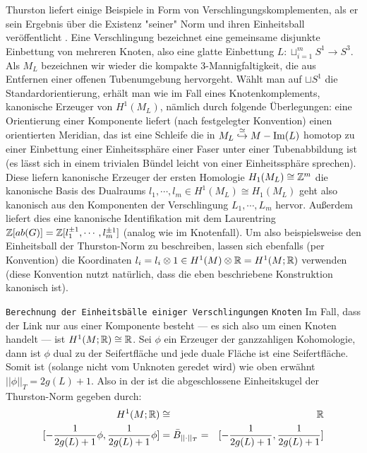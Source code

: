    \begin{bsp}[Verschlingungen]
    \label{ex:links}
        Thurston liefert einige Beispiele in Form von Verschlingungskomplementen, als er sein Ergebnis über die Existenz "seiner" Norm und ihren Einheitsball veröffentlicht \cite{Thurston1986}. Eine Verschlingung bezeichnet eine gemeinsame disjunkte Einbettung von mehreren Knoten, also eine glatte Einbettung $L: \sqcup_{i=1}^m S^1 \to S^3$. Als $M_L$ bezeichnen wir wieder die kompakte 3-Mannigfaltigkeit, die aus Entfernen einer offenen Tubenumgebung hervorgeht. Wählt man auf $\sqcup S^1$ die Standardorientierung, erhält man wie im Fall eines Knotenkomplements, kanonische Erzeuger von $H^1(M_L)$, nämlich durch folgende Überlegungen: eine Orientierung einer Komponente liefert (nach festgelegter Konvention) einen orientierten Meridian, das ist eine Schleife die in $M_L\stackrel \simeq {\hookrightarrow} M - \operatorname{Im}(L)$ homotop zu einer Einbettung einer Einheitssphäre einer Faser unter einer Tubenabbildung ist (es lässt sich in einem trivialen Bündel leicht von einer Einheitssphäre sprechen). Diese liefern kanonische Erzeuger der ersten Homologie $H_1(M_L) \cong \mathbb{Z}^m$ die kanonische Basis des Dualraums $l_1,\cdots,l_m \in H^1(M_L)\cong H_1(M_L)$ geht also kanonisch aus den Komponenten der Verschlingung $L_1,\cdots,L_m$ hervor. Außerdem liefert dies eine kanonische Identifikation mit dem Laurentring $\mathbb{Z}[ab(G)]=\mathbb{Z}[l_1^{\pm 1},\cdots,l_m^{\pm 1}]$ (analog wie im Knotenfall). Um also beispielsweise den Einheitsball der Thurston-Norm zu beschreiben, lassen sich ebenfalls (per Konvention) die Koordinaten $l_i=l_i \otimes 1 \in H^1(M)\otimes \mathbb{R} = H^1(M;\mathbb{R})$ verwenden (diese Konvention nutzt natürlich, dass die eben beschriebene Konstruktion kanonisch ist).\\

    \end{bsp}
        \texttt{Berechnung der Einheitsbälle einiger Verschlingungen}
        \texttt{Knoten}
        Im Fall, dass der Link nur aus einer Komponente besteht --- es sich also um einen Knoten handelt --- ist $H^1(M;\mathbb{R})\cong \mathbb{R}$. Sei $\phi$ ein Erzeuger der ganzzahligen Kohomologie, dann ist $\phi$ dual zu der Seifertfläche und jede duale Fläche ist eine Seifertfläche. Somit ist (solange nicht vom Unknoten geredet wird) wie oben erwähnt $||\phi||_T=2g(L)+1$. Also in der ist die abgeschlossene Einheitskugel der Thurston-Norm gegeben durch:
        \begin{eqnarray*}
            H^1(M;\mathbb{R}) &\cong & \mathbb{R} \\
            {[- \frac{1}{2g(L)+1} \phi,\frac 1 {2g(L)+1} \phi]} & = \bar B_{||\cdot||_T}=& {[- \frac 1 {2g(L)+1}, \frac 1 {2g(L)+1}]}
        \end{eqnarray*}
